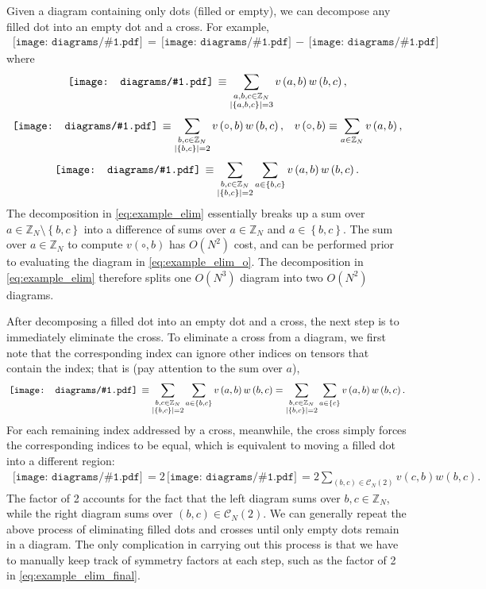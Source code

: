 \documentclass[nofootinbib,notitlepage,11pt]{revtex4-2}
\newcommand{\p}[1]{\left(#1\right)} %
\renewcommand{\set}[1]{\left\{#1\right\}} %
\newcommand{\1}{\mathds{1}}
\newcommand{\C}{\mathcal{C}}
\newcommand{\ZZ}{\mathbb{Z}}
\newcommand{\diagram}[1]
{\,\texttt{[image: diagrams/\#1.pdf]}\,}
\begin{document}
Given a diagram containing only dots (filled or empty), we can
decompose any filled dot into an empty dot and a cross.  For example,
\begin{align}
  \diagram{example_elim}
  = \diagram{example_elim_o}
  - \diagram{example_elim_x}
  \label{eq:example_elim}
\end{align}
where
\begin{align}
  \diagram{example_elim}
  \equiv \sum_{\substack{a,b,c\in\ZZ_N\\\abs{\set{a,b,c}}=3}}
  v\p{a,b} w\p{b,c},
\end{align}
\begin{align}
  \diagram{example_elim_o}
  \equiv \sum_{\substack{b,c\in\ZZ_N\\\abs{\set{b,c}}=2}}
  v\p{\circ,b} w\p{b,c},
  &&
  v\p{\circ,b} \equiv \sum_{a\in\ZZ_N} v\p{a,b},
  \label{eq:example_elim_o}
\end{align}
\begin{align}
  \diagram{example_elim_x}
  \equiv \sum_{\substack{b,c\in\ZZ_N\\\abs{\set{b,c}}=2}}
  \sum_{a\in\set{b,c}} v\p{a,b} w\p{b,c}.
\end{align}
The decomposition in \eqref{eq:example_elim} essentially breaks up a
sum over $a\in\ZZ_N\setminus\set{b,c}$ into a difference of sums over
$a\in\ZZ_N$ and $a\in\set{b,c}$.  The sum over $a\in\ZZ_N$ to compute
$v\p{\circ,b}$ has $O\p{N^2}$ cost, and can be performed prior to
evaluating the diagram in \eqref{eq:example_elim_o}.  The
decomposition in \eqref{eq:example_elim} therefore splits one
$O\p{N^3}$ diagram into two $O\p{N^2}$ diagrams.

After decomposing a filled dot into an empty dot and a cross, the next
step is to immediately eliminate the cross.  To eliminate a cross from
a diagram, we first note that the corresponding index can ignore other
indices on tensors that contain the index; that is (pay attention to
the sum over $a$),
\begin{align}
  \diagram{example_elim_x}
  \equiv \sum_{\substack{b,c\in\ZZ_N\\\abs{\set{b,c}}=2}}
  \sum_{a\in\set{b,c}} v\p{a,b} w\p{b,c}
  = \sum_{\substack{b,c\in\ZZ_N\\\abs{\set{b,c}}=2}}
  \sum_{a\in\set{c}} v\p{a,b} w\p{b,c}.
\end{align}
For each remaining index addressed by a cross, meanwhile, the cross
simply forces the corresponding indices to be equal, which is
equivalent to moving a filled dot into a different region:
\begin{align}
  \diagram{example_elim_x}
  = 2 \diagram{example_elim_x_full}
  = 2 \sum_{\p{b,c}\in\C_N\p{2}} v\p{c,b} w\p{b,c}.
  \label{eq:example_elim_final}
\end{align}
The factor of 2 accounts for the fact that the left diagram sums over
$b,c\in\ZZ_N$, while the right diagram sums over
$\p{b,c}\in\C_N\p{2}$.  We can generally repeat the above process of
eliminating filled dots and crosses until only empty dots remain in a
diagram.  The only complication in carrying out this process is that
we have to manually keep track of symmetry factors at each step, such
as the factor of 2 in \eqref{eq:example_elim_final}.
\end{document}
